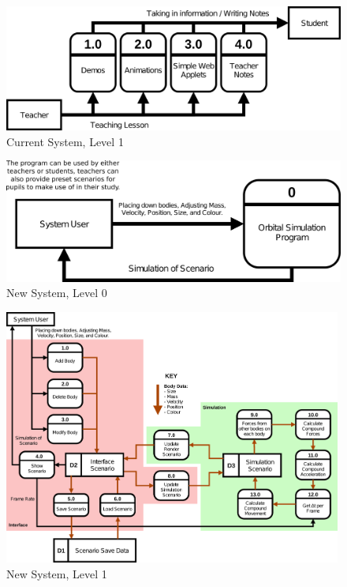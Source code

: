 \begin{figure}[!ht]
  \centering
  \includegraphics[width=\textwidth]{img/csl1.png}
  \caption{Current System, Level 1}
\end{figure}

\begin{figure}[H]
  \centering
  \includegraphics[width=\textwidth]{img/nsl0.png}
  \caption{New System, Level 0}
\end{figure}

\begin{figure}[!ht]
  \centering
  \includegraphics[angle=-90, width=0.99\textwidth]{img/nsl1.png}
  \caption{New System, Level 1}
\end{figure}

